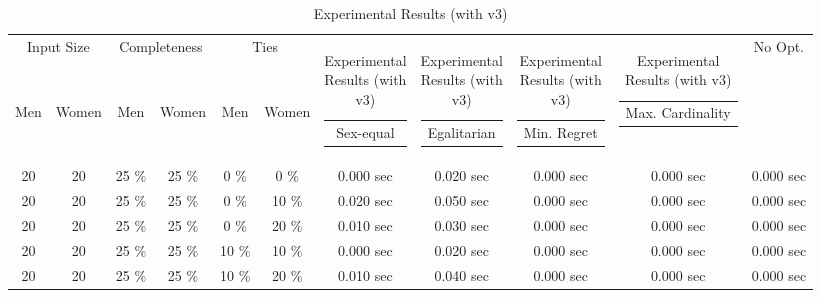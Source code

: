 \documentclass{article}
\begin{document}
\setlength\LTleft{-1.3in}

\small

\begin{longtable}[]{@{}ccccccccccc@{}}

\caption{Experimental Results (with v3)}
\label{exp-v3}\\

\hline \multicolumn{2}{c}{Input Size} & \multicolumn{2}{c}{Completeness} & \multicolumn{2}{c}{Ties} & \multicolumn{1}{c}{\multirow{2}{*}{\begin{tabular}[c]{@{}c@{}}Sex-equal\end{tabular}}} & \multicolumn{1}{c}{\multirow{2}{*}{\begin{tabular}[c]{@{}c@{}}Egalitarian\end{tabular}}} & \multicolumn{1}{c}{\multirow{2}{*}{\begin{tabular}[c]{@{}c@{}}Min. Regret\end{tabular}}} & \multicolumn{1}{c}{\multirow{2}{*}{\begin{tabular}[c]{@{}c@{}}Max. Cardinality\end{tabular}}} & \multicolumn{1}{c}{\multirow{2}{*}{No Opt.}} \\
Men           & Women          & Men             & Women          & Men         & Women      & \multicolumn{1}{c}{}                                                                                  & \multicolumn{1}{c}{}                                                                                    & \multicolumn{1}{c}{}                                                                                       & \multicolumn{1}{c}{}                                                                                            & \multicolumn{1}{c}{}                                 \\ \hline
\endhead
%
\bottomrule
\endfoot
%
\endlastfoot
%
20 & 20 & 25 \% & 25 \% & 0 \% & 0 \% & 0.000 sec & 0.020 sec & 0.000 sec & 0.000 sec & 0.000 sec \\
20 & 20 & 25 \% & 25 \% & 0 \% & 10 \% & 0.020 sec & 0.050 sec & 0.000 sec & 0.000 sec & 0.000 sec \\
20 & 20 & 25 \% & 25 \% & 0 \% & 20 \% & 0.010 sec & 0.030 sec & 0.000 sec & 0.000 sec & 0.000 sec \\
20 & 20 & 25 \% & 25 \% & 10 \% & 10 \% & 0.000 sec & 0.020 sec & 0.000 sec & 0.000 sec & 0.000 sec \\
20 & 20 & 25 \% & 25 \% & 10 \% & 20 \% & 0.010 sec & 0.040 sec & 0.000 sec & 0.000 sec & 0.000 sec \\

\end{longtable}
\end{document}

